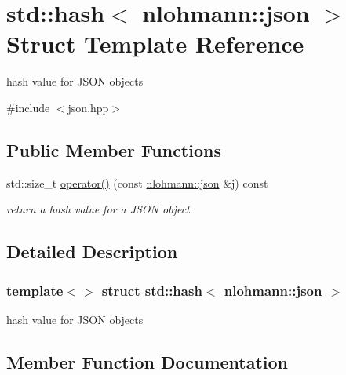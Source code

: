 \hypertarget{structstd_1_1hash_3_01nlohmann_1_1json_01_4}{}\section{std\+::hash$<$ nlohmann\+::json $>$ Struct Template Reference}
\label{structstd_1_1hash_3_01nlohmann_1_1json_01_4}


hash value for J\+S\+ON objects  




{\ttfamily \#include $<$json.\+hpp$>$}

\subsection*{Public Member Functions}
\begin{DoxyCompactItemize}
\item 
std\+::size\+\_\+t \mbox{\hyperlink{structstd_1_1hash_3_01nlohmann_1_1json_01_4_aec1567d1fa47dbe5b77954dce3a55b64}{operator()}} (const \mbox{\hyperlink{namespacenlohmann_a2bfd99e845a2e5cd90aeaf1b1431f474}{nlohmann\+::json}} \&j) const
\begin{DoxyCompactList}\small\item\em return a hash value for a J\+S\+ON object \end{DoxyCompactList}\end{DoxyCompactItemize}


\subsection{Detailed Description}
\subsubsection*{template$<$$>$\newline
struct std\+::hash$<$ nlohmann\+::json $>$}

hash value for J\+S\+ON objects 

\subsection{Member Function Documentation}
\mbox{\label{structstd_1_1hash_3_01nlohmann_1_1json_01_4_aec1567d1fa47dbe5b77954dce3a55b64}} 
